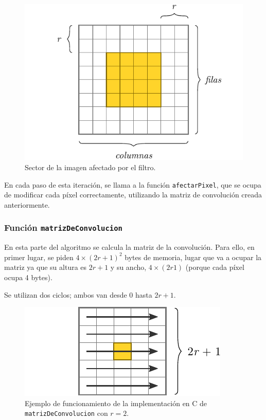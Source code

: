         \begin{figure}
          \centering \includegraphics{imagenes/zona-afectada.pdf}
          \caption{Sector de la imagen afectado por el filtro.} \label{fig:zona-afectada}
        \end{figure}

      En cada paso de esta iteración, se llama a la función \texttt{afectarPixel}, que se ocupa de modificar cada píxel correctamente, utilizando la matriz de convolución creada anteriormente. 

      \subsubsection*{Función \texttt{matrizDeConvolucion}}

        En esta parte del algoritmo se calcula la matriz de la convolución. Para ello, en primer lugar, se piden $4 \times (2r + 1)^2$ bytes de memoria, lugar que va a ocupar la matriz ya que su altura es $2r + 1$ y su ancho, $4 \times (2r 1)$ (porque cada píxel ocupa 4 bytes).
        
        Se utilizan dos ciclos; ambos van desde 0 hasta $2r + 1$. 
        
        \begin{figure}
          \centering \includegraphics{imagenes/matriz-de-convolucion-c.pdf}
          \caption{Ejemplo de funcionamiento de la implementación en C de \texttt{matrizDeConvolucion} con $r = 2$.} \label{fig:matriz-de-convolucion-c}
        \end{figure}

